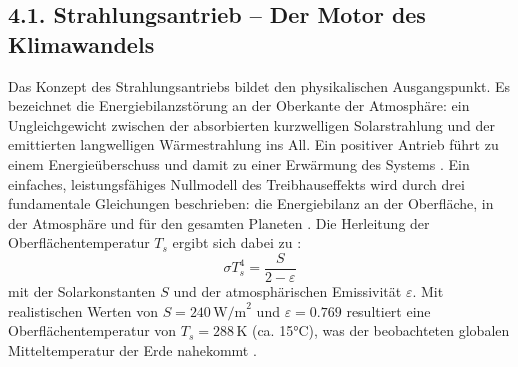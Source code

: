 \documentclass[12pt, a4paper]{article}
\begin{document}
	\subsection*{4.1. Strahlungsantrieb – Der Motor des Klimawandels}
	Das Konzept des Strahlungsantriebs bildet den physikalischen Ausgangspunkt.
	Es bezeichnet
	die Energiebilanzstörung an der Oberkante der Atmosphäre: ein Ungleichgewicht zwischen der
	absorbierten kurzwelligen Solarstrahlung und der emittierten langwelligen Wärmestrahlung
	ins All.
	Ein positiver Antrieb führt zu einem Energieüberschuss und damit zu einer
	Erwärmung des Systems \cite{open2025}.
	Ein einfaches, leistungsfähiges Nullmodell des Treibhauseffekts wird durch drei fundamentale
	Gleichungen beschrieben: die Energiebilanz an der Oberfläche, in der Atmosphäre und für den
	gesamten Planeten \cite{realclimate2007}.
	Die Herleitung der Oberflächentemperatur \(T_s\)
	ergibt sich dabei zu \cite{realclimate2007}:
	\[
	\sigma T_s^4 = \frac{S}{2 - \varepsilon}
	\]
	mit der Solarkonstanten \(S\) und der atmosphärischen Emissivität \(\varepsilon\).
	Mit
	realistischen Werten von \(S = 240 \, \text{W/m}^2\) und \(\varepsilon = 0.769\) resultiert
	eine Oberflächentemperatur von \(T_s = 288 \, \text{K}\) (ca. 15°C), was der beobachteten
	globalen Mitteltemperatur der Erde nahekommt \cite{realclimate2007}.
	
\end{document}
